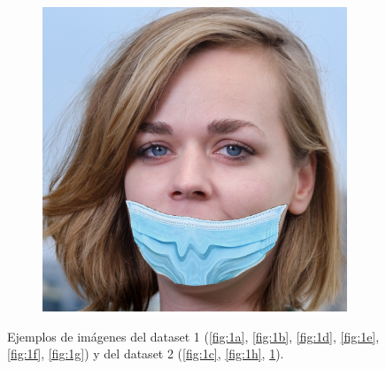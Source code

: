 \begin{figure}[htp]
	\begin{subfigure}{0.2\linewidth}
		\includegraphics[width=\linewidth]{imagenes/dataset1-9.jpg}
		\caption{}
		\label{fig:1i}
	\end{subfigure}
	\caption{Ejemplos de imágenes del dataset 1 (\ref{fig:1a}, \ref{fig:1b}, \ref{fig:1d}, \ref{fig:1e}, \ref{fig:1f}, \ref{fig:1g}) y del dataset 2 (\ref{fig:1c}, \ref{fig:1h}, \ref{fig:1i}).}
	\label{fig:1}
\end{figure}


